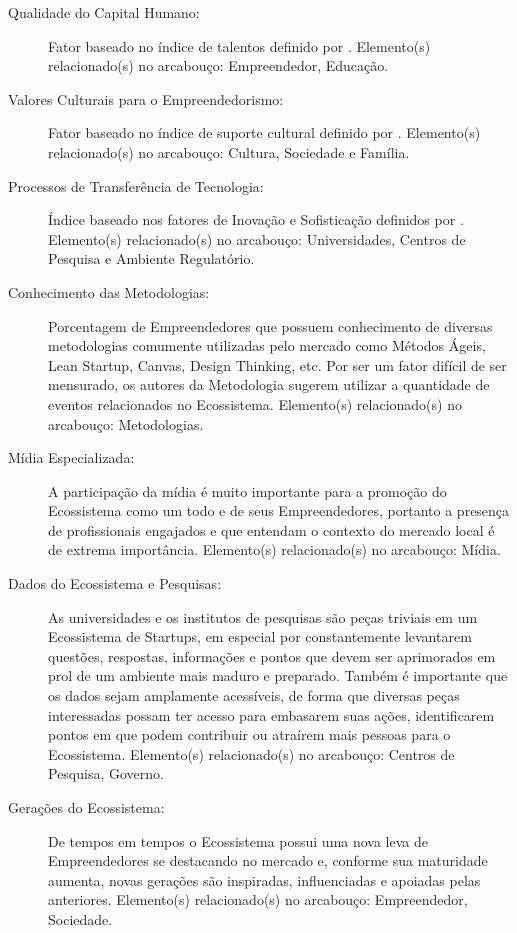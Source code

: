 \begin{description}
  \item [Qualidade do Capital Humano:] Fator baseado no índice de talentos definido por . Elemento(s) relacionado(s) no arcabouço: Empreendedor, Educação.

  \item [Valores Culturais para o Empreendedorismo:] Fator baseado no índice de suporte cultural definido por . Elemento(s) relacionado(s) no arcabouço: Cultura, Sociedade e Família.

  \item [Processos de Transferência de Tecnologia:] Índice baseado nos fatores de Inovação e Sofisticação definidos por . Elemento(s) relacionado(s) no arcabouço: Universidades, Centros de Pesquisa e Ambiente Regulatório.

  \item [Conhecimento das Metodologias:] Porcentagem de Empreendedores que possuem conhecimento de diversas metodologias comumente utilizadas pelo mercado como Métodos Ágeis, Lean Startup, Canvas, Design Thinking, etc. Por ser um fator difícil de ser mensurado, os autores da Metodologia sugerem utilizar a quantidade de eventos relacionados no Ecossistema. Elemento(s) relacionado(s) no arcabouço: Metodologias.

  \item [Mídia Especializada:] A participação da mídia é muito importante para a promoção do Ecossistema como um todo e de seus Empreendedores, portanto a presença de profissionais engajados e que entendam o contexto do mercado local é de extrema importância. Elemento(s) relacionado(s) no arcabouço: Mídia.

  \item [Dados do Ecossistema e Pesquisas:] As universidades e os institutos de pesquisas são peças triviais em um Ecossistema de Startups, em especial por constantemente levantarem questões, respostas, informações e pontos que devem ser aprimorados em prol de um ambiente mais maduro e preparado. Também é importante que os dados sejam amplamente acessíveis, de forma que diversas peças interessadas possam ter acesso para embasarem suas ações, identificarem pontos em que podem contribuir ou atraírem mais pessoas para o Ecossistema. Elemento(s) relacionado(s) no arcabouço: Centros de Pesquisa, Governo.
  
  \item [Gerações do Ecossistema:] De tempos em tempos o Ecossistema possui uma nova leva de Empreendedores se destacando no mercado e, conforme sua maturidade aumenta, novas gerações são inspiradas, influenciadas e apoiadas pelas anteriores. Elemento(s) relacionado(s) no arcabouço: Empreendedor, Sociedade.       
\end{description}

